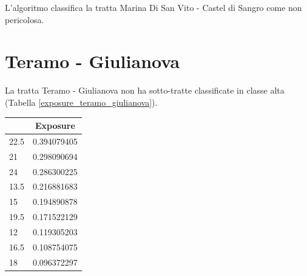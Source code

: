 L'algoritmo classifica la tratta Marina Di San Vito - Castel di Sangro come non pericolosa. 

\section{Teramo - Giulianova}
La tratta Teramo - Giulianova non ha sotto-tratte classificate in classe alta (Tabella \ref{exposure_teramo_giulianova}).

\begin{table}[H]
	\centering
	\begin{tabular}{|l|l|}
		\hline
		\rowcolor[HTML]{C0C0C0} 
		\multicolumn{1}{|c|}{\cellcolor[HTML]{C0C0C0}\textbf{Km}} & \multicolumn{1}{c|}{\cellcolor[HTML]{C0C0C0}\textbf{Exposure}} \\ \hline
		\rowcolor[HTML]{F8FF00} 
		22.5                                                      & 0.394079405                                                    \\ \hline
		\rowcolor[HTML]{F8FF00} 
		21                                                        & 0.298090694                                                    \\ \hline
		\rowcolor[HTML]{F8FF00} 
		24                                                        & 0.286300225                                                    \\ \hline
		\rowcolor[HTML]{F8FF00} 
		13.5                                                      & 0.216881683                                                    \\ \hline
		\rowcolor[HTML]{32CB00} 
		15                                                        & 0.194890878                                                    \\ \hline
		\rowcolor[HTML]{32CB00} 
		19.5                                                      & 0.171522129                                                    \\ \hline
		\rowcolor[HTML]{32CB00} 
		12                                                        & 0.119305203                                                    \\ \hline
		\rowcolor[HTML]{32CB00} 
		16.5                                                      & 0.108754075                                                    \\ \hline
		\rowcolor[HTML]{32CB00} 
		18                                                        & 0.096372297                                                    \\ \hline

\end{tabular}
\end{table}
